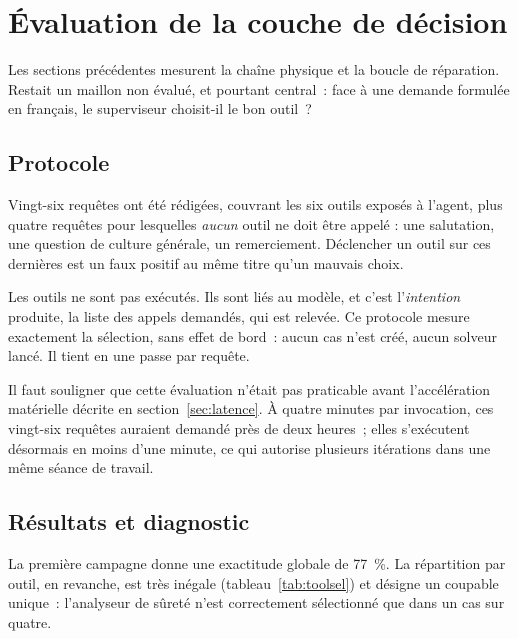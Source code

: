 \documentclass[12pt,a4paper,french]{report}
\begin{document}
\section{Évaluation de la couche de décision}
\label{sec:toolselection}

Les sections précédentes mesurent la chaîne physique et la boucle de
réparation. Restait un maillon non évalué, et pourtant central~: face à une
demande formulée en français, le superviseur choisit-il le bon outil~?

\subsection{Protocole}

Vingt-six requêtes ont été rédigées, couvrant les six outils exposés à l'agent,
plus quatre requêtes pour lesquelles \emph{aucun} outil ne doit être appelé : une salutation, une question de culture générale, un remerciement. Déclencher
un outil sur ces dernières est un faux positif au même titre qu'un mauvais
choix.

Les outils ne sont pas exécutés. Ils sont liés au modèle, et c'est
l'\emph{intention} produite, la liste des appels demandés, qui est relevée.
Ce protocole mesure exactement la sélection, sans effet de bord~: aucun cas
n'est créé, aucun solveur lancé. Il tient en une passe par requête.

Il faut souligner que cette évaluation n'était pas praticable avant
l'accélération matérielle décrite en section~\ref{sec:latence}. À quatre
minutes par invocation, ces vingt-six requêtes auraient demandé près de deux
heures~; elles s'exécutent désormais en moins d'une minute, ce qui autorise
plusieurs itérations dans une même séance de travail.

\subsection{Résultats et diagnostic}

La première campagne donne une exactitude globale de \SI{77}{\percent}. La
répartition par outil, en revanche, est très inégale
(tableau~\ref{tab:toolsel}) et désigne un coupable unique~: l'analyseur de
sûreté n'est correctement sélectionné que dans un cas sur quatre.
\end{document}
